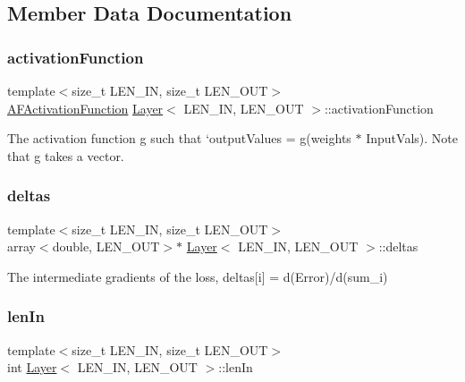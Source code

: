 \subsection{Member Data Documentation}
\mbox{\label{class_layer_a53bead8fe194586f9ab2f69b11de3d87}} 
\subsubsection{\texorpdfstring{activation\+Function}{activationFunction}}
{\footnotesize\ttfamily template$<$size\+\_\+t L\+E\+N\+\_\+\+IN, size\+\_\+t L\+E\+N\+\_\+\+O\+UT$>$ \\
\hyperlink{class_a_f_activation_function}{A\+F\+Activation\+Function} \hyperlink{class_layer}{Layer}$<$ L\+E\+N\+\_\+\+IN, L\+E\+N\+\_\+\+O\+UT $>$\+::activation\+Function}



The activation function {\ttfamily g} such that `output\+Values = g(weights $\ast$ Input\+Vals). Note that g takes a vector. 

\mbox{\label{class_layer_aeefbb274f205f4960c4a1a3ed5f5d807}} 
\subsubsection{\texorpdfstring{deltas}{deltas}}
{\footnotesize\ttfamily template$<$size\+\_\+t L\+E\+N\+\_\+\+IN, size\+\_\+t L\+E\+N\+\_\+\+O\+UT$>$ \\
array$<$double, L\+E\+N\+\_\+\+O\+UT$>$$\ast$ \hyperlink{class_layer}{Layer}$<$ L\+E\+N\+\_\+\+IN, L\+E\+N\+\_\+\+O\+UT $>$\+::deltas}



The intermediate gradients of the loss, {\ttfamily deltas\mbox{[}i\mbox{]} = d(\+Error)/d(sum\+\_\+i)} 

\mbox{\label{class_layer_a844e22c542ae02cb475cabb8353300a8}} 
\subsubsection{\texorpdfstring{len\+In}{lenIn}}
{\footnotesize\ttfamily template$<$size\+\_\+t L\+E\+N\+\_\+\+IN, size\+\_\+t L\+E\+N\+\_\+\+O\+UT$>$ \\
int \hyperlink{class_layer}{Layer}$<$ L\+E\+N\+\_\+\+IN, L\+E\+N\+\_\+\+O\+UT $>$\+::len\+In}



